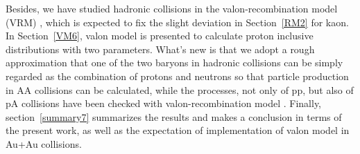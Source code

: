 \documentclass[twocolumn,aps,superscriptaddress,showpacs,nofootinbib,floatfix]{revtex4}
\begin{document}
Besides, we have studied hadronic collisions in the valon-recombination model (VRM) \cite{5i}, which is expected to fix the slight deviation in Section~\ref{RM2} for kaon. In Section~\ref{VM6}, valon model is presented to calculate proton inclusive distributions with two parameters. What's new is that we adopt a rough approximation that one of the two baryons in hadronic collisions can be simply regarded as the combination of protons and neutrons so that particle production in AA collisions can be calculated, while the processes, not only of pp, but also of pA collisions have been checked with valon-recombination model \cite{6c}. Finally, section~\ref{summary7} summarizes the results and makes a conclusion in terms of the present work, as well as the expectation of implementation of valon model in Au+Au collisions. 



\end{document}
